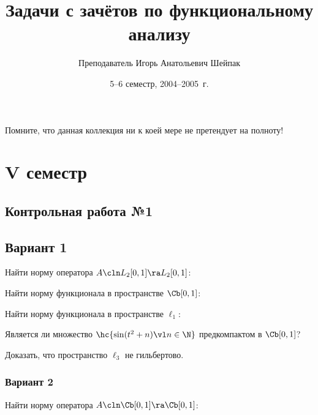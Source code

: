 \documentclass[a4paper]{article}
\title{Задачи с зачётов по функциональному анализу}
\author{Преподаватель Игорь Анатольевич Шейпак}
\date{5--6 семестр, 2004--2005~г.}
\begin{document}
\maketitle

\centerline{\footnotesize Помните, что данная коллекция ни к коей мере не претендует на полноту!}

\section{V семестр}

\subsection{Контрольная работа №1}

\subsection{Вариант 1}
\setcounter{problem}{0}
\begin{problem}
Найти норму оператора $A\cln  L_2[0,1] \ra L_2[0,1]$:
\end{problem}

\begin{problem}
Найти норму функционала в пространстве $\Cb[0,1]$:
\end{problem}

\begin{problem}
Найти норму функционала в пространстве $\ell_1$:
\end{problem}

\begin{problem}
Является ли множество $\hc{\sin(t^2+n) \vl n \in \N}$ предкомпактом в $\Cb[0,1]$?
\end{problem}

\begin{problem}
Доказать, что пространство $\ell_3$ не гильбертово.
\end{problem}

\subsubsection{Вариант 2}

\setcounter{problem}{0}
\begin{problem}
Найти норму оператора $A\cln \Cb[0,1]\ra \Cb[0,1]$:
\end{problem}
\end{document}
